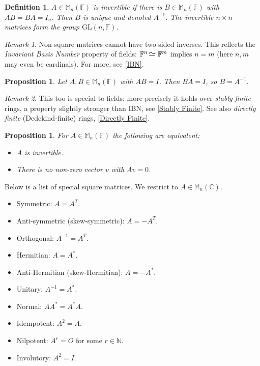 \documentclass[12pt]{article}
\newcommand{\iso}{\scaleobj{1.3}{\hspace{1pt}{\simeq} \hspace{2pt}}}
\theoremstyle{breakplain}
\newtheorem{prop}[theorem]{Proposition}
\theoremstyle{breakdef}
\newtheorem{definition}[theorem]{Definition}
\theoremstyle{remark}
\newtheorem*{remark}{Remark}
\begin{document}
\begin{definition}
    $A\in \mathbb{M}_{n}(\mathbb{F})$ is \emph{invertible} if there is $B\in \mathbb{M}_{n}(\mathbb{F})$ with $AB=BA=I_n$. Then $B$ is unique and denoted $A^{-1}$. The invertible $n\times n$ matrices form the group $\mathrm{GL}(n,\mathbb{F})$.
\end{definition}
\begin{remark}
    Non-square matrices cannot have two-sided inverses. This reflects the \emph{Invariant Basis Number} property of fields: $\mathbb{F}^n\iso\mathbb{F}^m$ implies $n=m$ (here $n,m$ may even be cardinals). For more, see \href{https://en.wikipedia.org/wiki/Invariant_basis_number}{[IBN]}.
\end{remark}
\begin{prop}
    Let $A,B\in \mathbb{M}_n(\mathbb{F})$ with $AB=I$. Then $BA=I$, so $B=A^{-1}$.
\end{prop}
\begin{remark}
    This too is special to fields; more precisely it holds over \emph{stably finite} rings, a property slightly stronger than IBN, see \href{https://en.wikipedia.org/wiki/Stably_finite_ring}{[Stably Finite]}. See also \emph{directly finite} (Dedekind-finite) rings, \href{https://en.wikipedia.org/wiki/Dedekind-finite_ring}{[Directly Finite]}.
\end{remark}
\begin{prop}
    For $A\in\mathbb{M}_n(\mathbb{F})$ the following are equivalent:
    \begin{itemize}
        \item $A$ is invertible.
        \item There is no non-zero vector $v$ with $Av=0$.
    \end{itemize}
\end{prop}

Below is a list of special square matrices. We restrict to $A\in\mathbb{M}_n(\mathbb{C})$.
\begin{itemize}
    \item Symmetric: $A=A^T$.
    \item Anti-symmetric (skew-symmetric): $A=-A^T$.
    \item Orthogonal: $A^{-1}=A^T$.
    \item Hermitian: $A=A^*$.
    \item Anti-Hermitian (skew-Hermitian): $A=-A^*$.
    \item Unitary: $A^{-1}=A^*$.
    \item Normal: $AA^*=A^*A$.
    \item Idempotent: $A^2=A$.
    \item Nilpotent: $A^r=O$ for some $r\in \mathbb{N}$.
    \item Involutory: $A^2=I$.
\end{itemize}
\end{document}
